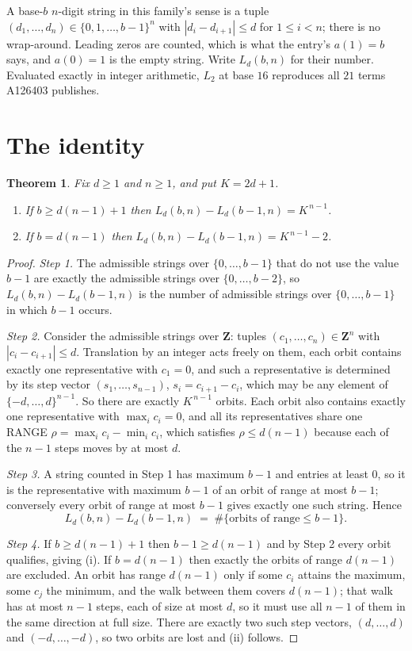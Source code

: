 \documentclass[11pt,a4paper]{article}
\theoremstyle{plain}
\newtheorem{theorem}{Theorem}
\theoremstyle{definition}
\begin{document}
A base-$b$ $n$-digit string in this family's sense is a tuple
$(d_1,\dots,d_n)\in\{0,1,\dots,b-1\}^{n}$ with $|d_i-d_{i+1}|\le d$ for $1\le i<n$; there
is no wrap-around. Leading zeros are counted, which is what the entry's $a(1)=b$ says, and
$a(0)=1$ is the empty string. Write $L_d(b,n)$ for their number. Evaluated exactly in integer
arithmetic, $L_{2}$ at base $16$ reproduces all $21$ terms A126403 publishes.

\section{The identity}

\begin{theorem}
Fix $d\ge1$ and $n\ge1$, and put $K=2d+1$.
\begin{enumerate}
\item[(i)] If $b\ge d(n-1)+1$ then $L_d(b,n)-L_d(b-1,n)=K^{\,n-1}$.
\item[(ii)] If $b=d(n-1)$ then $L_d(b,n)-L_d(b-1,n)=K^{\,n-1}-2$.
\end{enumerate}
\end{theorem}

\begin{proof}
\emph{Step 1.} The admissible strings over $\{0,\dots,b-1\}$ that do not use the value $b-1$
are exactly the admissible strings over $\{0,\dots,b-2\}$, so $L_d(b,n)-L_d(b-1,n)$ is the
number of admissible strings over $\{0,\dots,b-1\}$ in which $b-1$ occurs.

\emph{Step 2.} Consider the admissible strings over $\mathbf{Z}$: tuples
$(c_1,\dots,c_n)\in\mathbf{Z}^{n}$ with $|c_i-c_{i+1}|\le d$. Translation by an integer acts
freely on them, each orbit contains exactly one representative with $c_1=0$, and such a
representative is determined by its step vector $(s_1,\dots,s_{n-1})$, $s_i=c_{i+1}-c_i$,
which may be any element of $\{-d,\dots,d\}^{n-1}$. So there are exactly $K^{\,n-1}$ orbits.
Each orbit also contains exactly one representative with $\max_i c_i=0$, and all its
representatives share one RANGE $\rho=\max_ic_i-\min_ic_i$, which satisfies
$\rho\le d(n-1)$ because each of the $n-1$ steps moves by at most $d$.

\emph{Step 3.} A string counted in Step 1 has maximum $b-1$ and entries at least $0$, so it is
the representative with maximum $b-1$ of an orbit of range at most $b-1$; conversely every orbit
of range at most $b-1$ gives exactly one such string. Hence
\[
L_d(b,n)-L_d(b-1,n)\;=\;\#\{\text{orbits of range}\le b-1\} .
\]

\emph{Step 4.} If $b\ge d(n-1)+1$ then $b-1\ge d(n-1)$ and by Step 2 every orbit qualifies,
giving (i). If $b=d(n-1)$ then exactly the orbits of range $d(n-1)$ are excluded. An orbit has
range $d(n-1)$ only if some $c_i$ attains the maximum, some $c_j$ the minimum, and the walk
between them covers $d(n-1)$; that walk has at most $n-1$ steps, each of size at most $d$, so it
must use all $n-1$ of them in the same direction at full size. There are exactly two such step
vectors, $(d,\dots,d)$ and $(-d,\dots,-d)$, so two orbits are lost and (ii) follows.
\end{proof}
\end{document}
